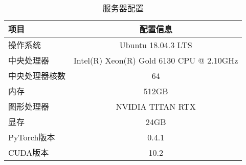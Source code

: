 
\begin{table}
  \centering
  \caption{服务器配置}
  \begin{tabular}{lc}
    \toprule
    项目  & 配置信息       \\
    \midrule
    操作系统 & Ubuntu 18.04.3 LTS \\
    中央处理器 & Intel(R) Xeon(R) Gold 6130 CPU @ 2.10GHz \\
    中央处理器核数 & 64 \\
    内存    & 512GB \\
    图形处理器    & NVIDIA TITAN RTX \\
    显存   & 24GB \\
    PyTorch版本   & 0.4.1 \\
    CUDA版本   & 10.2 \\
    \bottomrule
  \end{tabular}
  \label{tab:gpu}
\end{table}



